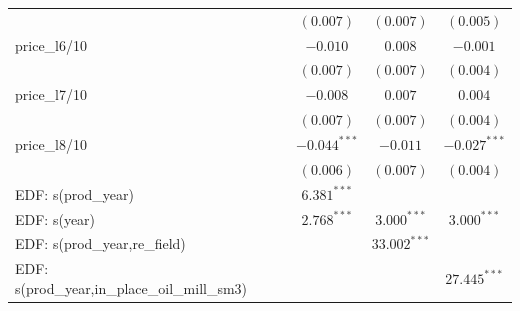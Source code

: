 \documentclass[11pt]{article}
\begin{document}
\begin{table}
\begin{center}
\begin{tabular}{l c c c }
                                             & $(0.007)$      & $(0.007)$      & $(0.005)$        \\
price\_l6/10                              & $-0.010$       & $0.008$        & $-0.001$         \\
                                             & $(0.007)$      & $(0.007)$      & $(0.004)$        \\
price\_l7/10                              & $-0.008$       & $0.007$        & $0.004$          \\
                                             & $(0.007)$      & $(0.007)$      & $(0.004)$        \\
price\_l8/10                              & $-0.044^{***}$ & $-0.011$       & $-0.027^{***}$   \\
                                             & $(0.006)$      & $(0.007)$      & $(0.004)$        \\
EDF: s(prod\_year)                           & $6.381^{***}$  &                &                  \\
EDF: s(year)                                 & $2.768^{***}$  & $3.000^{***}$  & $3.000^{***}$    \\
                                          
EDF: s(prod\_year,re\_field)                      &                & $33.002^{***}$ &                  \\
                                           
EDF: s(prod\_year,in\_place\_oil\_mill\_sm3) &                &                & $27.445^{***}$   \\
                                   

\end{tabular}
\end{center}
\end{table}
\end{document}
